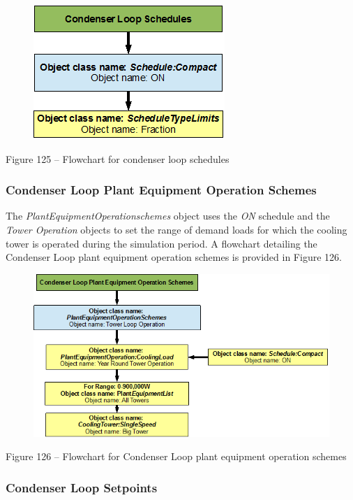 \begin{figure}[htbp]
\centering
\includegraphics{media/image125.png}
\caption{}
\end{figure}

Figure 125 -- Flowchart for condenser loop schedules

\subsubsection{Condenser Loop Plant Equipment Operation Schemes}\label{condenser-loop-plant-equipment-operation-schemes-000}

The \emph{PlantEquipmentOperationschemes} object uses the \emph{ON} schedule and the \emph{Tower Operation} objects to set the range of demand loads for which the cooling tower is operated during the simulation period. A flowchart detailing the Condenser Loop plant equipment operation schemes is provided in Figure 126.

\begin{figure}[htbp]
\centering
\includegraphics{media/image126.png}
\caption{}
\end{figure}

Figure 126 -- Flowchart for Condenser Loop plant equipment operation schemes

\subsubsection{Condenser Loop Setpoints}\label{condenser-loop-setpoints-000}

